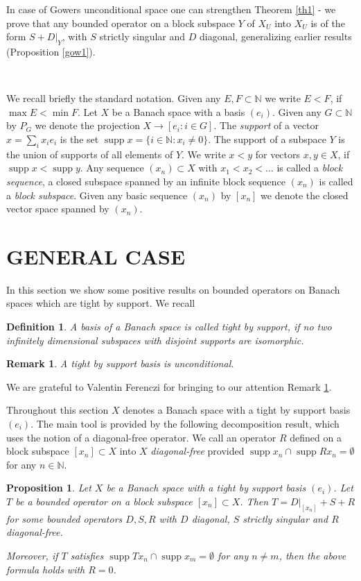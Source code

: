 \documentclass{amsart}
\newtheorem{proposition}[theorem]{Proposition}
\newtheorem{definition}[theorem]{Definition}
\newtheorem{remark}[theorem]{Remark}
\numberwithin{subsection}{section}
\numberwithin{equation}{section}
\begin{document}
In case of Gowers unconditional space one can strengthen Theorem \ref{th1} - we prove that any bounded operator on a block subspace $Y$ of $X_U$ into $X_U$ is of the form $S+D|_Y$, with $S$ strictly singular and $D$ diagonal, generalizing earlier results (Proposition \ref{gow1}).

\

We recall briefly the standard notation. Given any $E,F\subset {{\mathbb{N}}}$ we write $E<F$, if $\max E<\min F$. Let $X$ be a Banach space with a basis $(e_i)$. Given any $G\subset{{\mathbb{N}}}$ by $P_G$ we denote the projection $X\to [e_i: i\in G]$. The \textit{support} of a vector $x=\sum_i x_i e_i$ is the set $\operatorname{supp} x =\{ i\in {{\mathbb{N}}} : x_i\neq 0\}$. The support of a subspace $Y$ is the union of supports of all elements of $Y$. We write $x<y$ for vectors $x,y\in X$, if $\operatorname{supp} x<\operatorname{supp} y$. Any sequence $(x_n)\subset X$ with $x_{1}<x_{2}<\dots$ is called a  \textit{block sequence}, a closed subspace spanned by an infinite block sequence $(x_n)$ is called a \textit{block subspace}. Given any basic sequence $(x_n)$ by $[x_n]$ we denote the closed vector space spanned by $(x_n)$.

\section{GENERAL CASE}
In this section we show some positive results on bounded operators on Banach spaces which are tight by support. 
We recall
\begin{definition}\cite{FR1}
 A basis of a Banach space is called tight by support, if no two infinitely dimensional subspaces with disjoint supports are isomorphic.
\end{definition}
\begin{remark}\cite{FR1}\label{unc}
 A tight by support basis is unconditional.
\end{remark}
We are grateful to Valentin Ferenczi for bringing to our attention Remark \ref{unc}.

Throughout this section $X$ denotes a Banach space with a tight by support basis $(e_i)$. The main tool is provided by the following decomposition result, which uses the notion of a diagonal-free operator. We call an operator $R$ defined on a block subspace $[x_n]\subset X$ into $X$ \textit{diagonal-free} provided $\operatorname{supp} x_n\cap\operatorname{supp} Rx_n=\emptyset$ for any $n\in{{\mathbb{N}}}$. 
\begin{proposition}\label{prop1} 
Let $X$ be a Banach space with a tight by support basis $(e_i)$. Let $T$ be a bounded operator on a block subspace $[x_n]\subset X$. Then $T=D|_{[x_n]}+S+R$ for some bounded operators $D,S,R$ with $D$ diagonal, $S$ strictly singular and $R$  diagonal-free.

Moreover, if $T$ satisfies $\operatorname{supp} Tx_n\cap \operatorname{supp} x_m=\emptyset$ for any $n\neq m$, then the above formula holds with $R=0$.
\end{proposition}
\end{document}
